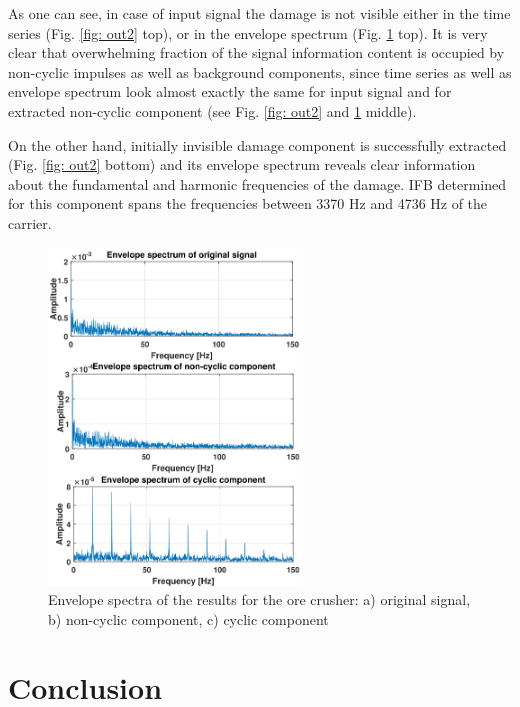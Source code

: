 \documentclass[preprint,12pt]{elsarticle}
\begin{document}
As one can see, in case of input signal the damage is not visible either in the time series (Fig. \ref{fig: out2} top), or in the envelope spectrum (Fig. \ref{fig: widma2} top). It is very clear that overwhelming fraction of the signal information content is occupied by non-cyclic impulses as well as background components, since time series as well as envelope spectrum look almost exactly the same for input signal and for extracted non-cyclic component (see Fig. \ref{fig: out2} and \ref{fig: widma2} middle). 

On the other hand, initially invisible damage component is successfully extracted (Fig. \ref{fig: out2} bottom) and its envelope spectrum reveals clear information about the fundamental and harmonic frequencies of the damage. IFB determined for this component spans the frequencies between 3370 Hz and 4736 Hz of the carrier.

\begin{figure}[!ht]
\centering
\includegraphics[width = 0.6\textwidth]{figs3/widma.png}
\caption{Envelope spectra of the results for the ore crusher: a) original signal, b) non-cyclic component, c) cyclic component}
\label{fig: widma2}
\end{figure}

\section{Conclusion}
\end{document}
